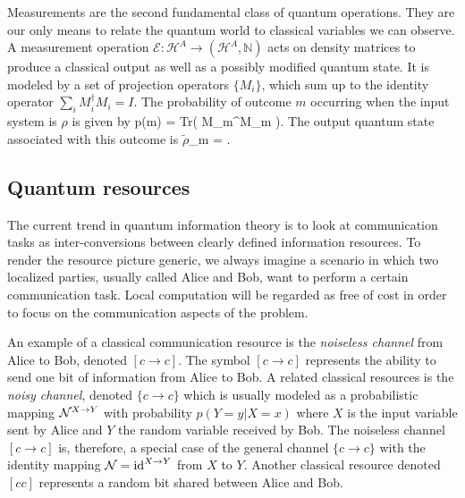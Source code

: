 \documentclass[aps,11pt,twoside,letterpaper]{article}
\def\Tr{\textup{Tr}}
\def\E{\mathcal{E}}
\def\cH{\mathcal{H}}
\def\NN{\mathbb{N}}
\newcommand{\rhot}{{\ensuremath{\tilde{\rho}}}}
\begin{document}
				
			Measurements are the second fundamental class of quantum operations. 
			They are our only means to relate the quantum world to classical variables we can observe.
			A measurement operation $\E\!\!:\!\!\cH^A \to (\cH^A,\NN)$ acts on density matrices to produce a classical
			output as well as a possibly modified quantum state.
			It is modeled by a set of projection operators $\{M_i\}$, which sum up to the identity operator 
			$\sum_i M_i^\dag M_i = I$.
			The probability of outcome $m$ occurring when the input system is $\rho$ is given by
			\be
				p(m)	=	\Tr\!\left( M_m^\dag \rho M_m \right).
			\ee
			The output quantum state associated with this outcome is
			\be
				 \rhot_m	=  \frac{M_m^\dag \rho M_m}{	\Tr\!\left( M_m^\dag \rho M_m \right)	}.
			\ee
			


		\bigskip
		\subsection{Quantum resources}	\label{subsection:quantum-resources}
		
			The current trend in quantum information theory is to look at communication tasks as inter-conversions
			between clearly defined information resources. 
			To render the resource picture generic, we always imagine a scenario in which two localized parties,
			usually called Alice and Bob, want to perform a certain communication task.
			Local computation will be regarded as free of cost in order to focus on the communication aspects 
			of the problem. 
			
			An example of a classical communication resource is the \emph{noiseless channel} from 
			Alice to Bob, denoted $[c\to c]$. 
			The symbol $[c \to c]$ represents the ability to send one bit of information from Alice to Bob.
			A related classical resources is the \emph{noisy channel}, denoted $\{c\to c\}$ which is usually 
			modeled as a probabilistic mapping ${\cal N}^{X \to Y}$ with probability $p(Y=y|X=x)$ where
			$X$ is the input variable sent by Alice and $Y$ the random variable received by Bob.
			The noiseless channel $[c\to c]$ is, therefore, a special case of the general channel $\{c\to c\}$ 
			with the identity mapping ${\cal N} = \operatorname{id}^{X \to Y}$ from $X$ to $Y$.
			Another classical resource denoted $[cc]$ represents a random bit shared between Alice and Bob.
			
\end{document}
